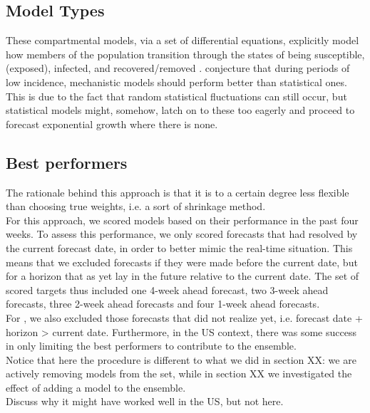 \subsection{Model Types}
These compartmental models, via a set of differential equations, explicitly model how members of the population transition through the states of being susceptible, (exposed), infected, and recovered/removed \cite{taylor_combining_2021}.
\cite{taylor_combining_2021} conjecture that during periods of low incidence, mechanistic models should perform better than statistical ones. This is due to the fact that random statistical fluctuations can still occur, but statistical models might, somehow, latch on to these too eagerly and proceed to forecast exponential growth where there is none.
\subsection{Best performers}
The rationale behind this approach is that it is to a certain degree less flexible than choosing true weights, i.e. a sort of shrinkage method.\\
For this approach, we scored models based on their performance in the past four weeks. To assess this performance, we only scored forecasts that had resolved by the current forecast date, in order to better mimic the real-time situation. This means that we excluded forecasts if they were made before the current date, but for a horizon that as yet lay in the future relative to the current date. The set of scored targets thus included one 4-week ahead forecast, two 3-week ahead forecasts, three 2-week ahead forecasts and four 1-week ahead forecasts.\\
For , we also excluded those forecasts that did not realize yet, i.e. forecast date + horizon > current date.
Furthermore, in the US context, there was some success in only limiting the best performers to contribute to the ensemble.\\
Notice that here the procedure is different to what we did in section XX: we are actively removing models from the set, while in section XX we investigated the effect of adding a model to the ensemble.\\
Discuss why it might have worked well in the US, but not here.
